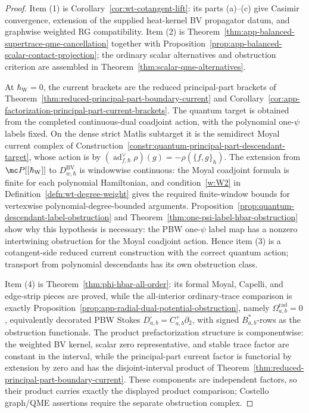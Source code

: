 \documentclass[11pt]{memoir}
\begin{document}
\begin{proof}
  Item (1) is Corollary~\ref{cor:wt-cotangent-lift}: its parts (a)--(c)
  give Casimir convergence, extension of the supplied heat-kernel BV
  propagator datum, and graphwise weighted RG compatibility.  Item (2) is
  Theorem~\ref{thm:app-balanced-supertrace-qme-cancellation} together
  with
  Proposition~\ref{prop:app-balanced-scalar-contact-projection}; the
  ordinary scalar alternatives and obstruction criterion are assembled in
  Theorem~\ref{thm:scalar-qme-alternatives}.

	  At \(\hbar_{\mathrm{W}}=0\), the current brackets are the reduced principal-part
  brackets of Theorem~\ref{thm:reduced-principal-part-boundary-current}
  and Corollary~\ref{cor:app-factorization-principal-part-current-brackets}.
  The quantum target is obtained from the completed continuous-dual
  coadjoint action, with the polynomial one-\(\psi\) labels fixed.  On the dense strict Matlis subtarget it is the
  semidirect Moyal current complex of
  Construction~\ref{constr:quantum-principal-part-descendant-target},
  whose action is by
	  \((\operatorname{ad}^{\vee}_{f,\hbar}\rho)(g)=-\rho(\{f,g\}_\hbar)\).
	  The extension from \(\mc P[[\hbar_{\mathrm{W}}]]\) to
  \(D^{\mathrm{BV}}_{w,\hbar}\) is windowwise continuous:
  the Moyal coadjoint formula is finite for each polynomial Hamiltonian,
  and condition~\ref{w:W2} in Definition~\ref{defn:wt-degree-weight}
	  gives the required finite-window bounds for vertexwise
	  polynomial-degree-bounded arguments.
  Proposition~\ref{prop:quantum-descendant-label-obstruction} and
  Theorem~\ref{thm:one-psi-label-hbar-obstruction} show why this
	  hypothesis is necessary: the PBW one-\(\psi\) label map has a nonzero
	  intertwining obstruction for the Moyal coadjoint action.  Hence item (3) is a
	  cotangent-side reduced current construction with the correct quantum
	  action; transport from polynomial descendants has its own
	  obstruction class.

  Item (4) is Theorem~\ref{thm:phi-hbar-all-order}: its formal Moyal,
  Capelli, and edge-strip pieces are proved, while the all-interior
  ordinary-trace comparison is exactly
  Proposition~\ref{prop:app-radial-dual-potential-obstruction}, namely
  \(\Omega^{\mathrm{rad}}_{a,b}=0\), equivalently decorated PBW Stokes
  \(D^\square_{a,b}=C^+_{a,b}\partial_2\), with signed
  \(B_{a,b}^*\)-rows as the obstruction functionals.  The product
  prefactorization structure is componentwise: the weighted BV kernel,
  scalar zero representative, and stable trace factor are constant in
  the interval, while the principal-part current factor is functorial by
  extension by zero and has the disjoint-interval product of
  Theorem~\ref{thm:reduced-principal-part-boundary-current}.  These
  components are independent factors, so their product carries exactly
  the displayed product comparison; Costello graph/QME assertions require
  the separate obstruction complex.
\end{proof}
\end{document}
